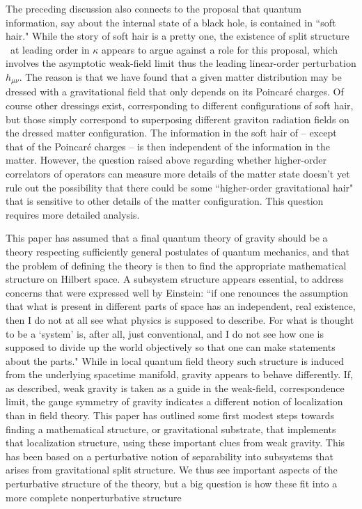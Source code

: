 The preceding discussion also connects to the proposal that quantum information, say about the internal state of a black hole, is contained in ``soft hair."  While the story of soft hair is a pretty one, the existence of split structure \splstr\ at leading order in $\kappa$ appears to argue against a role for this proposal\DoGithree, which  involves the asymptotic weak-field limit thus the leading linear-order perturbation $h_{\mu\nu}$.  The reason is that we have found that a given matter distribution may be dressed with a gravitational field that only depends on its Poincar\'e charges.  Of course other dressings exist, corresponding to different configurations of soft hair, but those simply correspond to superposing different graviton radiation fields on the dressed matter configuration.  The information in the soft hair of  -- except that of the Poincar\'e charges -- is then independent of the information in the matter.  However, the question raised above regarding whether higher-order correlators of operators can measure more details of the matter state doesn't yet rule out the possibility that   there could be some ``higher-order gravitational hair" that is sensitive to other details of the matter configuration.  This question requires more detailed analysis.


This paper has assumed that a final quantum theory of gravity should be a theory respecting sufficiently general postulates of quantum mechanics, and that the problem of defining the theory is then to find the appropriate mathematical structure on Hilbert space.  A subsystem structure appears essential, to address concerns that were expressed well by Einstein\Eins: ``if one renounces the assumption that what is present in different parts of space has an independent, real existence, then I do not at all see what physics is supposed to describe. For what is thought to be a `system' is, after all, just conventional, and I do not see how one is supposed to divide up the world objectively so that one can make statements about the parts."  While in local quantum field theory such structure is induced from the underlying spacetime manifold, gravity appears to behave differently.  If, as described, weak gravity is taken as a guide in the weak-field, correspondence limit, 
 the gauge symmetry of gravity indicates a different notion of localization than in field theory.  This paper has outlined some first modest steps towards finding a mathematical structure, or gravitational substrate, that implements that localization structure, using these important clues from weak gravity.  This has been based on a perturbative notion of separability into subsystems that arises from gravitational split structure\DoGithree.  We thus see important aspects of the perturbative structure of the theory, but a big question is how these fit into a more complete nonperturbative structure

